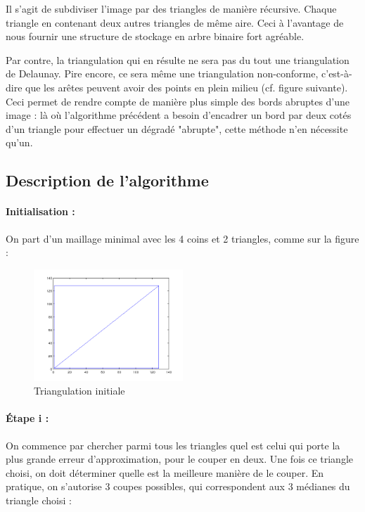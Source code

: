 \documentclass{report}
\begin{document}
Il s'agit de subdiviser l'image par des triangles de manière récursive. Chaque triangle en contenant deux autres triangles de même aire. Ceci à l'avantage de nous fournir une structure de stockage en arbre binaire fort agréable. 

Par contre, la triangulation qui en résulte ne sera pas du tout une triangulation de Delaunay. Pire encore, ce sera même une triangulation non-conforme, c'est-à-dire que les arêtes peuvent avoir des points en plein milieu (cf. figure suivante). Ceci permet de rendre compte de manière plus simple des bords abruptes d'une image : là où l'algorithme précédent a besoin d'encadrer un bord par deux cotés d'un triangle pour effectuer un dégradé "abrupte", cette méthode n'en nécessite qu'un.

\subsection{Description de l'algorithme}

\paragraph{Initialisation :}

On part d'un maillage minimal avec les 4 coins et 2 triangles, comme sur la figure :

\begin{figure}[ht]
\centering
\includegraphics[width=0.5\textwidth]{beginBissect.png}
\caption{Triangulation initiale}
\end{figure}

\clearpage

\paragraph{Étape i :}

On commence par chercher parmi tous les triangles quel est celui qui porte la plus grande erreur d'approximation, pour le couper en deux. Une fois ce triangle choisi, on doit déterminer quelle est la meilleure manière de le couper. En pratique, on s'autorise 3 coupes possibles, qui correspondent aux 3 médianes du triangle choisi :
\end{document}
